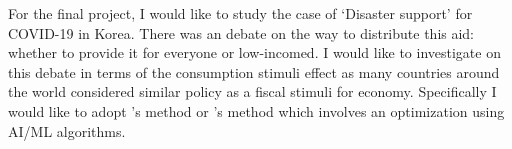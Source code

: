\documentclass[11pt]{article}
\begin{document}
	For the final project, I would like to study the case of `Disaster support' for COVID-19 in Korea. There was an debate on the way to distribute this aid: whether to provide it for everyone or low-incomed. I would like to investigate on this debate in terms of the consumption stimuli effect as many countries around the world considered similar policy as a fiscal stimuli for economy. Specifically I would like to adopt \cite{Kitagawa.2018}'s method or \cite{Athey.2017txo}'s method which involves an optimization using AI/ML algorithms.
	
	
	
	
	
\end{document}
